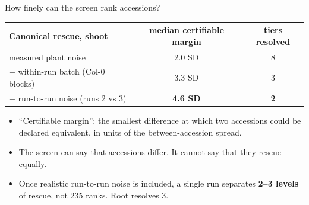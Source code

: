 \documentclass[aspectratio=169,11pt]{beamer}
\newcommand{\key}[1]{\textcolor{accent}{\textbf{#1}}}
\newcommand{\bad}[1]{\textcolor{warn}{\textbf{#1}}}
\begin{document}
\begin{frame}{How finely can the screen rank accessions?}
  \begin{center}
  \begin{tabular}{lcc}
    \toprule
    Canonical rescue, shoot & median certifiable margin & tiers resolved \\
    \midrule
    measured plant noise & 2.0 SD & 8 \\
    + within-run batch (Col-0 blocks) & 3.3 SD & 3 \\
    + run-to-run noise (runs 2 vs 3) & \bad{4.6 SD} & \bad{2} \\
    \bottomrule
  \end{tabular}
  \end{center}
  \begin{itemize}
    \item ``Certifiable margin'': the smallest difference at which two accessions could be
      declared equivalent, in units of the between-accession spread.
    \item The screen can say that accessions differ. It cannot say that they rescue
      equally.
    \item Once realistic run-to-run noise is included, a single run separates
      \key{2--3 levels} of rescue, not 235 ranks. Root resolves 3.
  \end{itemize}
\end{frame}
\end{document}
